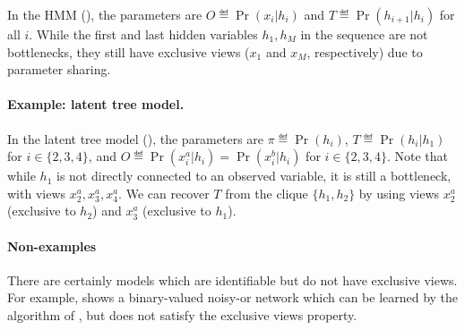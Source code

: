 In the HMM (), the parameters
are $O \eqdef \Pr(x_i|h_i)$ and $T \eqdef \Pr(h_{i+1} | h_i)$
for all $i$.
While the first and last hidden variables $h_1, h_M$ in the
  sequence are not bottlenecks, they still have exclusive views ($x_1$ and
  $x_M$, respectively)
  due to parameter sharing.

\paragraph{Example: latent tree model.}

In the latent tree model (), the parameters
are $\pi \eqdef \Pr(h_i)$, $T \eqdef \Pr(h_i | h_1)$ for $i \in \{2,3,4\}$,
and $O \eqdef \Pr(x^a_i | h_i) = \Pr(x^b_i | h_i)$ for $i \in \{2,3,4\}$.
Note that while $h_1$ is not directly connected to an observed variable,
  it is still a bottleneck, with views $x^a_2, x^a_3, x^a_4$.
We can recover $T$ from the clique $\{h_1, h_2\}$ by using views $x^a_2$
  (exclusive to $h_2$) and $x^a_3$ (exclusive to $h_1$).

\paragraph{Non-examples}
\label{sec:non-example}

There are certainly models which are identifiable but do not have exclusive views.
For example,  shows
  a binary-valued noisy-or network which can be
  learned by the algorithm of \citet{halpern13noisyor},
  but does not satisfy the exclusive views property.
